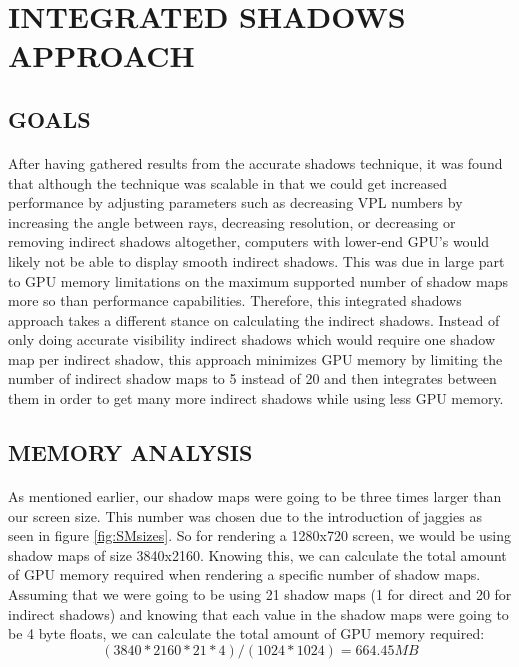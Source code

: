 \section{INTEGRATED SHADOWS APPROACH} \label{sec:newApproach}
\subsection{GOALS}
\paragraph{}
After having gathered results from the accurate shadows technique, it was found that although the technique was scalable in that we could get increased performance by adjusting parameters such as decreasing VPL numbers by increasing the angle between rays, decreasing resolution, or decreasing or removing indirect shadows altogether, computers with lower-end GPU's would likely not be able to display smooth indirect shadows.  This was due in large part to GPU memory limitations on the maximum supported number of shadow maps more so than performance capabilities.  Therefore, this integrated shadows approach takes a different stance on calculating the indirect shadows.  Instead of only doing accurate visibility indirect shadows which would require one shadow map per indirect shadow, this approach minimizes GPU memory by limiting the number of indirect shadow maps to 5 instead of 20 and then integrates between them in order to get many more indirect shadows while using less GPU memory.

\subsection{MEMORY ANALYSIS}
\paragraph{}
As mentioned earlier, our shadow maps were going to be three times larger than our screen size.  This number was chosen due to the introduction of jaggies as seen in figure \ref{fig:SMsizes}.  So for rendering a 1280x720 screen, we would be using shadow maps of size 3840x2160.  Knowing this, we can calculate the total amount of GPU memory required when rendering a specific number of shadow maps.  Assuming that we were going to be using 21 shadow maps (1 for direct and 20 for indirect shadows) and knowing that each value in the shadow maps were going to be 4 byte floats, we can calculate the total amount of GPU memory required:
\begin{equation}
(3840*2160*21*4)/(1024*1024) = 664.45 MB
\end{equation}

